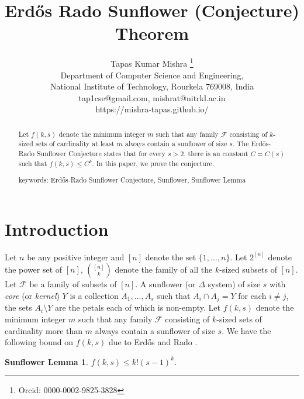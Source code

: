 \documentclass[runningheads,12pt,a4paper]{article}
\newtheorem*{sunlemma}{Sunflower Lemma}
\begin{document}
	\title{Erd\H{o}s Rado Sunflower (Conjecture) Theorem}
	\author{Tapas Kumar Mishra \footnote{Orcid: 0000-0002-9825-3828} \\
		Department of Computer Science and Engineering,\\
		National Institute of Technology, Rourkela
		769008, India\\
		tap1cse@gmail.com, mishrat@nitrkl.ac.in\\
		https://mishra-tapas.github.io/}
	\maketitle              %
	\begin{abstract}
		Let $f(k,s)$ denote the minimum integer $m$ such that
		any family $\mathcal{F}$ consisting of $k$-sized sets of cardinality at least $m$ always contain a sunflower of size $s$. The Erd\H{o}s-Rado Sunflower Conjecture states that 
		for every $s >2$, there is an constant $C=C(s)$ such that $f(k,s) \leq C^k$.
		In this paper, we prove the conjecture.
		
		keywords: {Erd\H{o}s-Rado Sunflower Conjecture, Sunflower, Sunflower Lemma}
	\end{abstract}
	\section{Introduction}
	Let $n$ be any positive integer and 
	$[n]$ denote the set $\{1,\ldots,n\}$. Let $2^{[n]}$ denote the power set of $[n]$, $\binom{[n]}{k}$ denote the family of all the $k$-sized subsets of $[n]$.
	Let $\mathcal{F}$ be a family of subsets of $[n]$. 
	A sunflower (or $\Delta$ system) of size $s$ with \emph{core} (or \emph{kernel}) $Y$ is a collection $A_1,\ldots,A_s$ such that $A_i \cap A_j=Y$ for each $i\neq j$, the sets $A_i \setminus Y$ are the petals each of which is non-empty.
	Let $f(k,s)$ denote the minimum integer $m$ such that
	any family $\mathcal{F}$ consisting of $k$-sized sets of cardinality more than $m$ always contain a sunflower of size $s$. We have the following bound on $f(k,s)$ due to
	Erd\H{o}s and Rado \cite{erdosrado1960}.
	
	\begin{sunlemma}\label{sunlemma}
		$f(k,s) \leq k!(s-1)^k$.
	\end{sunlemma}
	
\end{document}
